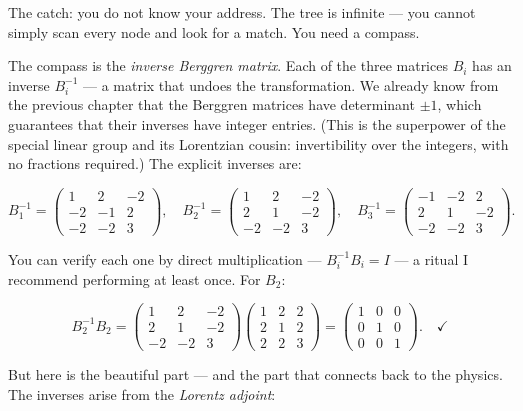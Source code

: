 \documentclass[12pt, letterpaper, openany]{book}
\theoremstyle{definition}
\theoremstyle{remark}
\begin{document}
The catch: you do not know your address. The tree is infinite --- you cannot simply scan every node and look for a match. You need a compass.

The compass is the \textit{inverse Berggren matrix}. Each of the three matrices $B_i$ has an inverse $B_i^{-1}$ --- a matrix that undoes the transformation. We already know from the previous chapter that the Berggren matrices have determinant $\pm 1$, which guarantees that their inverses have integer entries. (This is the superpower of the special linear group and its Lorentzian cousin: invertibility over the integers, with no fractions required.) The explicit inverses are:

\[
B_1^{-1} = \begin{pmatrix} 1 & 2 & -2 \\ -2 & -1 & 2 \\ -2 & -2 & 3 \end{pmatrix}, \quad B_2^{-1} = \begin{pmatrix} 1 & 2 & -2 \\ 2 & 1 & -2 \\ -2 & -2 & 3 \end{pmatrix}, \quad B_3^{-1} = \begin{pmatrix} -1 & -2 & 2 \\ 2 & 1 & -2 \\ -2 & -2 & 3 \end{pmatrix}.
\]

You can verify each one by direct multiplication --- $B_i^{-1} B_i = I$ --- a ritual I recommend performing at least once. For $B_2$:

\[
B_2^{-1} B_2 = \begin{pmatrix} 1 & 2 & -2 \\ 2 & 1 & -2 \\ -2 & -2 & 3 \end{pmatrix} \begin{pmatrix} 1 & 2 & 2 \\ 2 & 1 & 2 \\ 2 & 2 & 3 \end{pmatrix} = \begin{pmatrix} 1 & 0 & 0 \\ 0 & 1 & 0 \\ 0 & 0 & 1 \end{pmatrix}. \quad \checkmark
\]

But here is the beautiful part --- and the part that connects back to the physics. The inverses arise from the \textit{Lorentz adjoint}:
\end{document}
